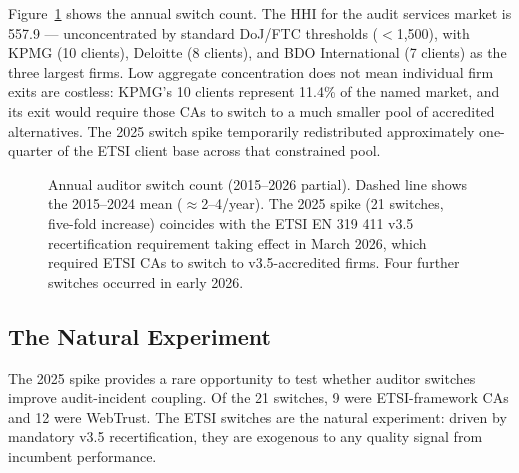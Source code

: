 \documentclass[10pt,twocolumn,letterpaper]{article}
\begin{document}
Figure~\ref{fig:switches} shows the annual switch count. The
HHI for the audit services market is 557.9 --- unconcentrated by
standard DoJ/FTC thresholds ($<$1,500), with KPMG (10 clients),
Deloitte (8 clients), and BDO International (7 clients) as the three
largest firms. Low aggregate concentration does not mean individual
firm exits are costless: KPMG's 10 clients represent 11.4\% of the
named market, and its exit would require those CAs to switch to a
much smaller pool of accredited alternatives. The 2025 switch spike
temporarily redistributed approximately one-quarter of the ETSI
client base across that constrained pool.

\begin{figure}[t]
\centering
{}
\caption{Annual auditor switch count (2015--2026 partial). Dashed line
shows the 2015--2024 mean ($\approx$2--4/year). The 2025 spike (21
switches, five-fold increase) coincides with the ETSI EN 319 411 v3.5
recertification requirement taking effect in March 2026, which required
ETSI CAs to switch to v3.5-accredited firms. Four further switches
occurred in early 2026.}
\label{fig:switches}
\end{figure}

\subsection{The Natural Experiment}
\label{sec:switches-experiment}

The 2025 spike provides a rare opportunity to test whether auditor
switches improve audit-incident coupling. Of the 21 switches, 9 were
ETSI-framework CAs and 12 were WebTrust. The ETSI switches are the
natural experiment: driven by mandatory v3.5 recertification, they
are exogenous to any quality signal from incumbent performance.
\end{document}

